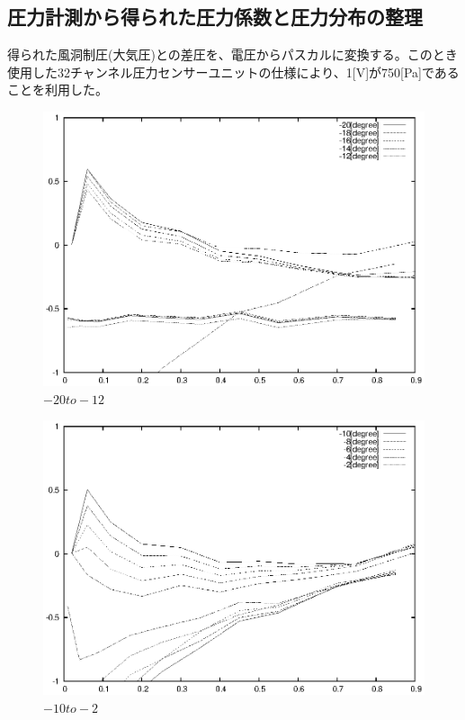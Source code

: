 \documentclass[a4j,twoside,openright,11pt]{jarticle}
\begin{document}
\newpage
\subsection{圧力計測から得られた圧力係数と圧力分布の整理}
得られた風洞制圧(大気圧)との差圧を、電圧からパスカルに変換する。このとき使用した32チャンネル圧力センサーユニットの仕様により、1[V]が750[Pa]であることを利用した。
\begin{figure}[htbp]
\begin{center}
\includegraphics[width=12cm]{./2-CP/-20to-12.eps}
\end{center}
\caption{$-20to-12$}
\end{figure}

\begin{figure}[htbp]
\begin{center}
\includegraphics[width=12cm]{./2-CP/-10to-2.eps}
\end{center}
\caption{$-10to-2$}
\end{figure}
\end{document}
